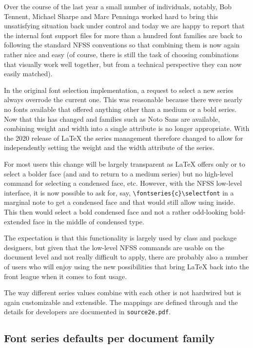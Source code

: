 \documentclass{ltnews}
\begin{document}
Over the course of the last year a small number of individuals,
notably, Bob Tennent, Michael Sharpe and Marc Penninga worked hard to
bring this unsatisfying situation back under control and today we are
happy to report that the internal font support files for more than a
hundred font families are back to following the standard NFSS conventions
so that combining them is now again rather nice and easy (of course,
there is still the task of choosing combinations that visually work
well together, but from a technical perspective they can now easily
matched).


In the original font selection implementation, a request to select a new series
always overrode the current one. This was reasonable because there
were nearly no fonts available that offered anything other than a
medium or a bold series. Now that this has changed and families such
as Noto Sans are available, combining weight and width into a single
attribute is no longer appropriate. With the 2020 release of \LaTeX{}
the series management therefore changed to allow for independently
setting the weight and the width attribute of the series.

For most users this change will be largely transparent as \LaTeX{}
offers only  or  to select a bolder face (and
 and  to return to a medium series) but no
high-level command for selecting a condensed face, etc. However, with
the NFSS low-level interface, it is now possible to ask for, say,
\verb=\fontseries{c}\selectfont= in a marginal note to get a condensed
face and that would still allow  using  inside. This then would
select a bold condensed face and not a rather odd-looking
bold-extended face in the middle of condensed type.

The expectation is that this functionality is largely used by class and package
designers, but given that the low-level NFSS commands are usable on
the document level and not really difficult to apply, there are
probably also a number of users who will enjoy using the new
possibilities that bring \LaTeX{} back into the front league when it
comes to font usage.

The way different series values combine with each other is not
hardwired but is again customizable and extensible. The mappings are
defined through  and the details for
developers are documented in \texttt{source2e.pdf}.



\subsection{Font series defaults per document family}
\end{document}
